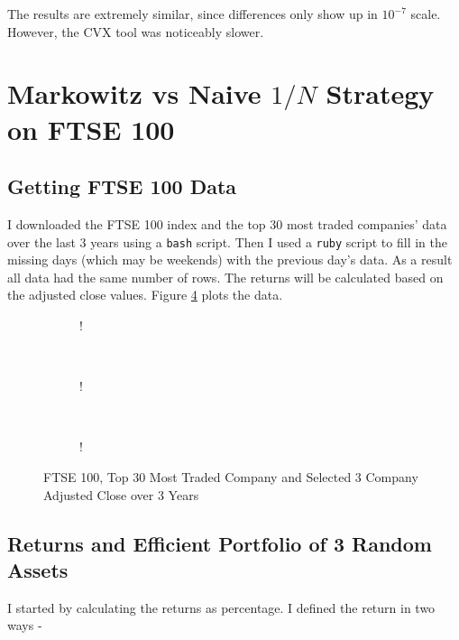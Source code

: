 \documentclass[11pt]{article}
\begin{document}
The results are extremely similar, since differences only show up in $10^{-7}$ scale. However, the
CVX tool was noticeably slower.

\section{Markowitz vs Naive $1/N$ Strategy on FTSE 100}

\subsection{Getting FTSE 100 Data}

I downloaded the FTSE 100 index and the top 30 most traded companies' data over the last 3 years using
a \texttt{bash} script. Then I used a \texttt{ruby} script to fill in the missing days (which may be
weekends) with the previous day's data. As a result all data had the same number of rows. The returns 
will be calculated based on the adjusted close values. Figure \ref{fig:q2_return} plots the data.

\begin{figure}[!h]
   \centering 
   \begin{subfigure}[b]{0.23\textwidth}
     	\resizebox {\textwidth} {!} { }
		\label{fig:q2-ftse}
    \end{subfigure}
    ~
    \begin{subfigure}[b]{0.23\textwidth}
       	\resizebox {\textwidth} {!} { }
        \label{fig:q2_returns}
    \end{subfigure}
	~
    \begin{subfigure}[b]{0.23\textwidth}
       	\resizebox {\textwidth} {!} { }
        \label{fig:q2_random_assets_return}
    \end{subfigure}	
	\vspace{-0.5cm}	
    \caption{FTSE 100, Top 30 Most Traded Company and Selected 3 Company Adjusted Close over 3 Years}\label{fig:naive_v_cvx}
	\label{fig:q2_return}	
	\vspace{-0.5cm}
\end{figure}

\subsection{Returns and Efficient Portfolio of 3 Random Assets}

I started by calculating the returns as percentage. I defined the return in two ways - 
\end{document}
